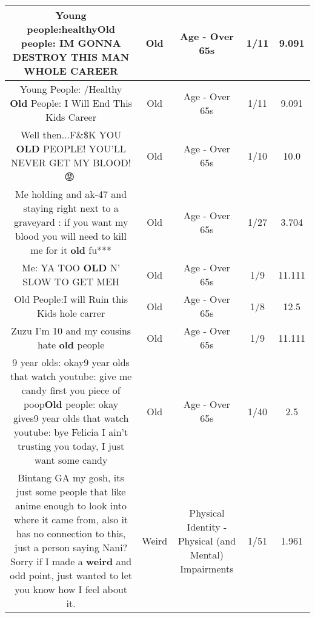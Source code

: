 \documentclass[11pt]{article}
\newlength\mylength
\begin{document}
\begin{center}
\begin{longtable}{|C{.65\mylength}|C{.30\mylength}|C{.12\mylength}|C{.12\mylength}|C{.12\mylength}|}
  \small Young people:healthy\textbf{Old} people: IM GONNA DESTROY THIS MAN WHOLE CAREER\normalsize   & Old & Age - Over 65s & 1/11 & 9.091 \\  \hline
  \small Young People: /Healthy \textbf{Old} People: I Will End This Kids Career\normalsize   & Old & Age - Over 65s & 1/11 & 9.091 \\  \hline
  \small Well then...F\&\$K YOU \textbf{OLD} PEOPLE! YOU'LL NEVER GET MY BLOOD!😡🤬\normalsize   & Old & Age - Over 65s & 1/10 & 10.0 \\  \hline
  \small Me holding and ak-47 and staying right next to a graveyard : if you want my blood you will need to kill me for it \textbf{old} fu***\normalsize   & Old & Age - Over 65s & 1/27 & 3.704 \\  \hline
  \small Me: YA TOO \textbf{OLD} N' SLOW TO GET MEH\normalsize   & Old & Age - Over 65s & 1/9 & 11.111 \\  \hline
  \small Old People:I will Ruin this Kids hole carrer\normalsize   & Old & Age - Over 65s & 1/8 & 12.5 \\  \hline
  \small Zuzu I'm 10 and my cousins hate \textbf{old} people\normalsize   & Old & Age - Over 65s & 1/9 & 11.111 \\  \hline
  \small 9 year olds: okay9 year olds that watch youtube: give me candy first you piece of poop\textbf{Old} people: okay gives9 year olds that watch youtube: bye Felicia I ain't trusting you today,  I just want some candy\normalsize   & Old & Age - Over 65s & 1/40 & 2.5 \\  \hline
  \small Bintang GA my gosh, its just some people that like anime enough to look into where it came from, also it has no connection to this, just a person saying Nani? Sorry if I made a \textbf{weird} and odd point, just wanted to let you know how I feel about it.\normalsize   & Weird & Physical Identity - Physical (and Mental) Impairments & 1/51 & 1.961 \\  \hline

\end{longtable}
\end{center}
\end{document}
